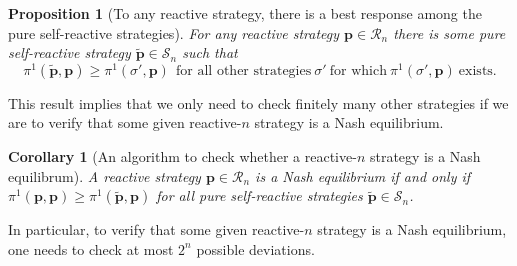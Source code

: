 \documentclass[11pt]{article}
\theoremstyle{plainCl1}
\newtheorem{corollary}{Corollary}
\newtheorem{proposition}{Proposition}
\theoremstyle{plainCl2}
\begin{document}
\begin{proposition}[To any reactive strategy, there is a best response among the pure self-reactive strategies]
\label{lemma:nash_against_pure_self_reactive} 
For any reactive strategy $\mathbf{p}\!\in\!\mathcal{R}_n$ there is some pure self-reactive strategy $\mathbf{\tilde p}\!\in\!\mathcal{S}_n$ such that 
 \begin{equation} \label{Eq:BRSelfReactive}
\pi^1(\mathbf{\tilde p},\mathbf{p}) \!\ge\! \pi^1(\sigma',\mathbf{p}) ~~\text{for all other strategies}~\sigma'~\text{for which}~ \pi^1(\sigma',\mathbf{p})~\text{exists}. 
\end{equation}
\end{proposition}

\noindent
This result implies that we only need to check finitely many other strategies if we are to verify that some given reactive-$n$ strategy is a Nash equilibrium. 

\begin{corollary}[An algorithm to check whether a reactive-$n$ strategy is a Nash equilibrum]
\label{Cor:NashCondition}
A reactive strategy $\mathbf{p}\!\in\!\mathcal{R}_n$ is a Nash equilibrium if and only if $\pi^1(\mathbf{p},\mathbf{p}) \!\ge\! \pi^1(\mathbf{\tilde p},\mathbf{p})$ for all pure self-reactive strategies $\mathbf{\tilde p}\!\in\!\mathcal{S}_n$. 
\end{corollary}

\noindent
In particular, to verify that some given reactive-$n$ strategy is a Nash equilibrium, one needs to check at most $2^n$ possible deviations.\\



\end{document}
